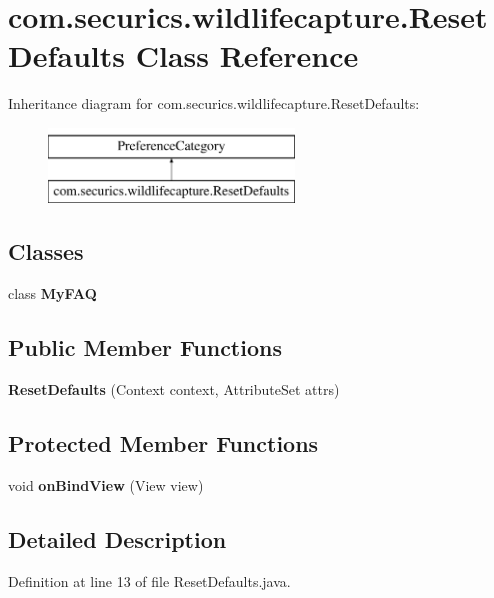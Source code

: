 \section{com.\+securics.\+wildlifecapture.\+Reset\+Defaults Class Reference}
\label{classcom_1_1securics_1_1wildlifecapture_1_1_reset_defaults}
Inheritance diagram for com.\+securics.\+wildlifecapture.\+Reset\+Defaults\+:\begin{figure}[H]
\begin{center}
\leavevmode
\includegraphics[height=2.000000cm]{classcom_1_1securics_1_1wildlifecapture_1_1_reset_defaults}
\end{center}
\end{figure}
\subsection*{Classes}
\begin{DoxyCompactItemize}
\item 
class {\bf My\+F\+A\+Q}
\end{DoxyCompactItemize}
\subsection*{Public Member Functions}
\begin{DoxyCompactItemize}
\item 
{\bf Reset\+Defaults} (Context context, Attribute\+Set attrs)
\end{DoxyCompactItemize}
\subsection*{Protected Member Functions}
\begin{DoxyCompactItemize}
\item 
void {\bf on\+Bind\+View} (View view)
\end{DoxyCompactItemize}


\subsection{Detailed Description}


Definition at line 13 of file Reset\+Defaults.\+java.



